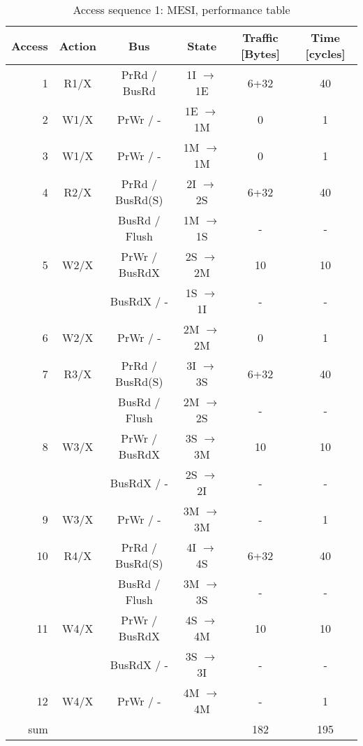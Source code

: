 \documentclass[a4paper,10pt]{article}
\begin{document}
\begin{table}[h]
  \centering
  \begin{tabular}{rccccc}
    Access & Action & Bus & State & Traffic [Bytes] & Time [cycles] \\ \hline
     1 & R1/X & PrRd / BusRd & 1I $\rightarrow$ 1E  & 6+32 & 40 \\
     2 & W1/X & PrWr / - & 1E $\rightarrow$ 1M & 0 & 1 \\
     3 & W1/X & PrWr / - & 1M $\rightarrow$ 1M & 0 & 1 \\

     4 & R2/X & PrRd / BusRd(S) & 2I $\rightarrow$ 2S  & 6+32 & 40 \\
       &      & BusRd / Flush & 1M $\rightarrow$ 1S & - & - \\

     5 & W2/X & PrWr / BusRdX & 2S $\rightarrow$ 2M & 10 & 10 \\
       &      & BusRdX / - & 1S $\rightarrow$ 1I & - & - \\

     6 & W2/X & PrWr / - & 2M $\rightarrow$ 2M & 0 & 1 \\

     7 & R3/X & PrRd / BusRd(S) & 3I $\rightarrow$ 3S  & 6+32 & 40 \\
       &      & BusRd / Flush & 2M $\rightarrow$ 2S & - & - \\
     8 & W3/X & PrWr / BusRdX & 3S $\rightarrow$ 3M & 10 & 10 \\
       &      & BusRdX / - & 2S $\rightarrow$ 2I & - & - \\
     9 & W3/X & PrWr / - & 3M $\rightarrow$ 3M & - & 1 \\

    10 & R4/X & PrRd / BusRd(S) & 4I $\rightarrow$ 4S  & 6+32 & 40 \\
       &      & BusRd / Flush & 3M $\rightarrow$ 3S & - & - \\
    11 & W4/X & PrWr / BusRdX & 4S $\rightarrow$ 4M & 10 & 10 \\
       &      & BusRdX / - & 3S $\rightarrow$ 3I & - & - \\
    12 & W4/X & PrWr / - & 4M $\rightarrow$ 4M & - & 1 \\ \hline

    sum & & & & 182 & 195 \\ \hline \hline
  \end{tabular}
  \caption{Access sequence 1: MESI, performance table}
  \label{tab:mesi_1}
\end{table}
\end{document}
